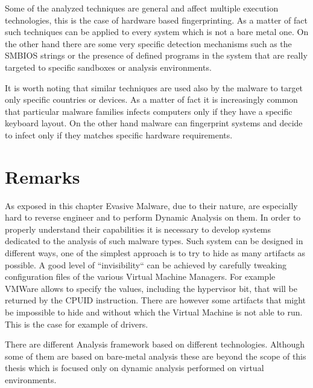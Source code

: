 Some of the analyzed techniques are general and affect multiple execution technologies, this is the case of hardware based fingerprinting. As a matter of fact such techniques can be applied to every system which is not a bare metal one. On the other hand there are some very specific detection mechanisms such as the SMBIOS strings or the presence of defined programs in the system that are really targeted to specific sandboxes or analysis environments. 

It is worth noting that similar techniques are used also by the malware to target only specific countries or devices. As a matter of fact it is increasingly common that particular malware families infects computers only if they have a specific keyboard layout. On the other hand malware can fingerprint systems and decide to infect only if they matches specific hardware requirements. 

\section{Remarks}


As exposed in this chapter Evasive Malware, due to their nature, are especially hard to reverse engineer and to perform Dynamic Analysis on them. In order to properly understand their capabilities it is necessary to develop systems dedicated to the analysis of such malware types. Such system can be designed in different ways, one of the simplest approach is to try to hide as many artifacts as possible. A good level of ``invisibility`` can be achieved by carefully tweaking configuration files of the various Virtual Machine Managers. For example VMWare allows to specify the values, including the hypervisor bit, that will be returned by the CPUID instruction. There are however some artifacts that might be impossible to hide and without which the Virtual Machine is not able to run. This is the case for example of drivers. 

There are different Analysis framework based on different technologies. Although some of them are based on bare-metal analysis these are beyond the scope of this thesis which is focused only on dynamic analysis performed on virtual environments.

